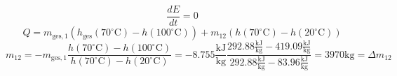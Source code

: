 

\item[d)] 
    \begin{equation}
    \frac{dE}{dt} = 0
    \end{equation}
    \begin{equation}
    Q = m_{\text{ges},1} \left( h_{\text{ges}}(70^\circ \text{C}) - h(100^\circ \text{C}) \right) + m_{12} \left( h(70^\circ \text{C}) - h(20^\circ \text{C}) \right)
    \end{equation}
    \begin{equation}
    m_{12} = - m_{\text{ges},1} \frac{h(70^\circ \text{C}) - h(100^\circ \text{C})}{h(70^\circ \text{C}) - h(20^\circ \text{C})} = - 8.755 \frac{\text{kJ}}{\text{kg}} \frac{292.88 \frac{\text{kJ}}{\text{kg}} - 419.09 \frac{\text{kJ}}{\text{kg}}}{292.88 \frac{\text{kJ}}{\text{kg}} - 83.96 \frac{\text{kJ}}{\text{kg}}} = 3970 \text{kg} = \Delta m_{12}
    \end{equation}